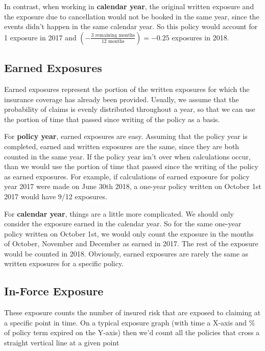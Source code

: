 \documentclass[11pt, english]{memoir}
\numberwithin{definition}{section}
\begin{document}
		In contrast, when working in \textbf{calendar year}, the original written exposure and the exposure due to cancellation would not be booked in the same year, since the events didn't happen in the same calendar year. So this policy would account for 1 exposure in 2017 and $(-\frac{\text{3 remaining months}}{\text{12 months}}) = -0.25$ exposures in 2018. 
	
	
	\subsection{Earned Exposures}
		Earned exposures represent the portion of the written exposures for which the insurance coverage has already been provided. Usually, we assume that the probability of claims is evenly distributed throughout a year, so that we can use the portion of time that passed since writing of the policy as a basis. 
	
		For \textbf{policy year}, earned exposures are easy. Assuming that the policy year is completed, earned and written exposures are the same, since they are both counted in the same year. If the policy year isn't over when calculations occur, than we would use the portion of time that passed since the writing of the policy as earned exposures. For example, if calculations of earned exposure for policy year 2017 were made on June 30th 2018, a one-year policy written on October 1st 2017 would have 9/12 exposures.
	
		For \textbf{calendar year}, things are a little more complicated. We should only consider the exposure earned in the calendar year. So for the same one-year policy written on October 1st, we would only count the exposure in the months of October, November and December as earned in 2017. The rest of the exposure would be counted in 2018. Obviously, earned exposures are rarely the same as written exposures for a specific policy. 
	
	
	
	\subsection{In-Force Exposure}
		These exposure counts the number of insured risk that are exposed to claiming at a specific point in time. On a typical exposure graph (with time a X-axis and \% of policy term expired on the Y-axis) then we'd count all the policies that cross a straight vertical line at a given point 
	
\end{document}
